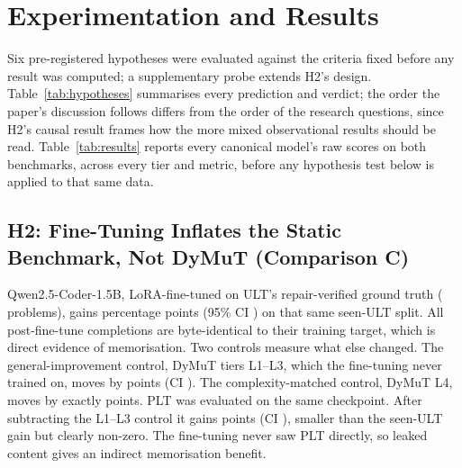 \section{Experimentation and Results}
\label{sec:results}

Six pre-registered hypotheses were evaluated against the criteria fixed before any result was computed; a supplementary probe extends H2's design. Table~\ref{tab:hypotheses} summarises every prediction and verdict; the order the paper's discussion follows differs from the order of the research questions, since H2's causal result frames how the more mixed observational results should be read. Table~\ref{tab:results} reports every canonical model's raw scores on both benchmarks, across every tier and metric, before any hypothesis test below is applied to that same data.



\subsection{H2: Fine-Tuning Inflates the Static Benchmark, Not DyMuT (Comparison C)}
\label{sec:results-h2}
Qwen2.5-Coder-1.5B, LoRA-fine-tuned on ULT's repair-verified ground truth (\HTwoSeenN{} problems), gains \HTwoSeenGain{} percentage points (95\% CI \HTwoSeenGainCI{}) on that same seen-ULT split. All \HTwoPreMutkTotal{} post-fine-tune completions are byte-identical to their training target, which is direct evidence of memorisation. Two controls measure what else changed. The general-improvement control, DyMuT tiers L1--L3, which the fine-tuning never trained on, moves by \HTwoLOneLThreeGain{} points (CI \HTwoLOneLThreeGainCI{}). The complexity-matched control, DyMuT L4, moves by exactly \HTwoLFourGain{} points. PLT was evaluated on the same checkpoint. After subtracting the L1--L3 control it gains \HTwoPltDid{} points (CI \HTwoPltDidCI{}), smaller than the seen-ULT gain but clearly non-zero. The fine-tuning never saw PLT directly, so leaked content gives an indirect memorisation benefit. %

